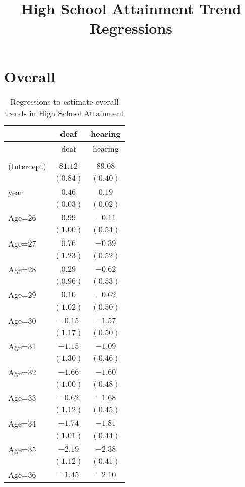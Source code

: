 \documentclass[fullpage]{paper}
\title{ High School Attainment Trend Regressions}
\begin{document}
\section{Overall}

\begin{center}
\begin{longtable}{l c c }
\hline
 & deaf & hearing \\
\hline
\endfirsthead
\hline
 & deaf & hearing \\
\hline
\endhead
\hline
\endfoot
\hline
\multicolumn{3}{l}{\scriptsize{}}\\
\caption{Regressions to estimate overall trends in High School Attainment}
\label{table:coefficients}
\endlastfoot
(Intercept) & $81.12$  & $89.08$  \\
            & $(0.84)$ & $(0.40)$ \\
year        & $0.46$   & $0.19$   \\
            & $(0.03)$ & $(0.02)$ \\
Age=26      & $0.99$   & $-0.11$  \\
            & $(1.00)$ & $(0.54)$ \\
Age=27      & $0.76$   & $-0.39$  \\
            & $(1.23)$ & $(0.52)$ \\
Age=28      & $0.29$   & $-0.62$  \\
            & $(0.96)$ & $(0.53)$ \\
Age=29      & $0.10$   & $-0.62$  \\
            & $(1.02)$ & $(0.50)$ \\
Age=30      & $-0.15$  & $-1.57$  \\
            & $(1.17)$ & $(0.50)$ \\
Age=31      & $-1.15$  & $-1.09$  \\
            & $(1.30)$ & $(0.46)$ \\
Age=32      & $-1.66$  & $-1.60$  \\
            & $(1.00)$ & $(0.48)$ \\
Age=33      & $-0.62$  & $-1.68$  \\
            & $(1.12)$ & $(0.45)$ \\
Age=34      & $-1.74$  & $-1.81$  \\
            & $(1.01)$ & $(0.44)$ \\
Age=35      & $-2.19$  & $-2.38$  \\
            & $(1.12)$ & $(0.41)$ \\
Age=36      & $-1.45$  & $-2.10$  \\

\end{longtable}
\end{center}
\end{document}
